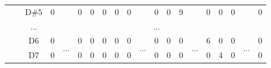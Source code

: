\documentclass[12pt]{article}
\begin{document}
\begin{table}[H]
{\begin{tabular}{clcccccccccccccccccc}
					   & \multicolumn{1}{l|}{} & \multicolumn{1}{c|}{D\#5} & \multicolumn{1}{c|}{0}    & \multicolumn{1}{c|}{}                     & \multicolumn{1}{c|}{0}    & \multicolumn{1}{c|}{0}    & \multicolumn{1}{c|}{0}    & \multicolumn{1}{c|}{0}    & \multicolumn{1}{c|}{0}  & \multicolumn{1}{c|}{}                     & \multicolumn{1}{c|}{0}    & \multicolumn{1}{c|}{0}    & \multicolumn{1}{c|}{9}    & \multicolumn{1}{c|}{}                     & \multicolumn{1}{c|}{0}  & \multicolumn{1}{c|}{0}  & \multicolumn{1}{c|}{0}  & \multicolumn{1}{c|}{}                     & \multicolumn{1}{c|}{0}  \\ \cline{3-4} \cline{6-10} \cline{12-14} \cline{16-18} \cline{20-20} 
					   & \multicolumn{1}{l|}{} & \multicolumn{1}{c|}{...}  & \multicolumn{17}{c|}{...}                                                                                                                                                                                                                                                                                                                                                                                                                                                                                                                       \\ \cline{3-4} \cline{6-10} \cline{12-14} \cline{16-18} \cline{20-20} 
					   & \multicolumn{1}{l|}{} & \multicolumn{1}{c|}{D6}   & \multicolumn{1}{c|}{0}    & \multicolumn{1}{c|}{\multirow{6}{*}{...}} & \multicolumn{1}{c|}{0}    & \multicolumn{1}{c|}{0}    & \multicolumn{1}{c|}{0}    & \multicolumn{1}{c|}{0}    & \multicolumn{1}{c|}{0}  & \multicolumn{1}{c|}{\multirow{6}{*}{...}} & \multicolumn{1}{c|}{0}    & \multicolumn{1}{c|}{0}    & \multicolumn{1}{c|}{0}    & \multicolumn{1}{c|}{\multirow{6}{*}{...}} & \multicolumn{1}{c|}{6}  & \multicolumn{1}{c|}{0}  & \multicolumn{1}{c|}{0}  & \multicolumn{1}{c|}{\multirow{6}{*}{...}} & \multicolumn{1}{c|}{0}  \\ \cline{3-4} \cline{6-10} \cline{12-14} \cline{16-18} \cline{20-20} 
					   & \multicolumn{1}{l|}{} & \multicolumn{1}{c|}{D7}   & \multicolumn{1}{c|}{0}    & \multicolumn{1}{c|}{}                     & \multicolumn{1}{c|}{0}    & \multicolumn{1}{c|}{0}    & \multicolumn{1}{c|}{0}    & \multicolumn{1}{c|}{0}    & \multicolumn{1}{c|}{0}  & \multicolumn{1}{c|}{}                     & \multicolumn{1}{c|}{0}    & \multicolumn{1}{c|}{0}    & \multicolumn{1}{c|}{0}    & \multicolumn{1}{c|}{}                     & \multicolumn{1}{c|}{0}  & \multicolumn{1}{c|}{4}  & \multicolumn{1}{c|}{0}  & \multicolumn{1}{c|}{}                     & \multicolumn{1}{c|}{0}  \\ \cline{3-4} \cline{6-10} \cline{12-14} \cline{16-18} \cline{20-20} 

\end{tabular}}
\end{table}
\end{document}
